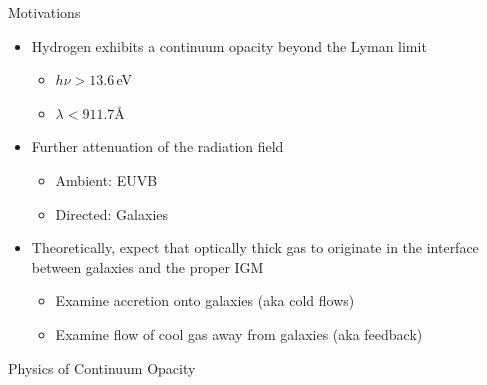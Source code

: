 \documentclass[12pt,letterpaper]{article}
\begin{document}

\begin{Aenumerate}

{\bf \item Motivations}
 \begin{itemize}
 \item Hydrogen exhibits a continuum opacity beyond the Lyman limit
 	\begin{itemize}
 	\item $h \nu > 13.6$\,eV
 	\item $\lambda < 911.7$\AA
 	\end{itemize}
 \item Further attenuation of the radiation field
 	\begin{itemize}
 	\item Ambient: EUVB
 	\item Directed: Galaxies
 	\end{itemize}
 \item Theoretically, expect that optically thick gas to originate in the 
 interface between galaxies and the proper IGM
 	\begin{itemize}
 	\item Examine accretion onto galaxies (aka cold flows)
 	\item Examine flow of cool gas away from galaxies (aka feedback)
 	\end{itemize}
 \end{itemize}

{\bf \item Physics of Continuum Opacity}
	\begin{itemize}


\end{itemize}
\end{Aenumerate}
\end{document}
